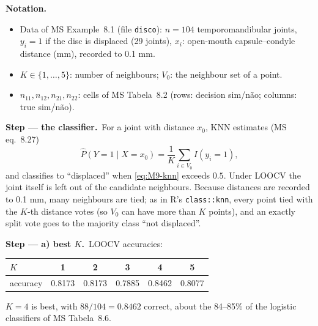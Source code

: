 \documentclass[11pt,a4paper]{article}
\numberwithin{equation}{questao}   %
\newenvironment{notacao}{\par\smallskip\noindent\textbf{Notation.}\begin{itemize}[leftmargin=1.4em,topsep=1pt,itemsep=0pt]\small}{\end{itemize}}
\newcommand{\passo}[2]{\par\smallskip\noindent\textbf{Step --- #1.}~#2}
\begin{document}
\begin{sol}
\begin{notacao}
\item Data of MS Example~8.1 (file \texttt{disco}): $n=104$ temporomandibular joints, $y_i=1$ if
  the disc is displaced (29 joints), $x_i$: open-mouth capsule--condyle distance (mm), recorded to 0.1 mm.
\item $K\in\{1,\dots,5\}$: number of neighbours; $V_0$: the neighbour set of a point.
\item $n_{11},n_{12},n_{21},n_{22}$: cells of MS Tabela~8.2 (rows: decision sim/não; columns: true sim/não).
\end{notacao}

\passo{the classifier}{For a joint with distance $x_0$, KNN estimates (MS eq.~8.27)
\begin{equation}\label{eq:M9-knn}
\hat P(Y=1\mid X=x_0)=\frac1K\sum_{i\in V_0}I(y_i=1),
\end{equation}
and classifies to ``displaced'' when \eqref{eq:M9-knn} exceeds $0.5$. Under LOOCV the joint itself is
left out of the candidate neighbours. Because distances are recorded to 0.1 mm, many neighbours
are tied; as in R's \texttt{class::knn}, every point tied with the $K$-th distance votes (so $V_0$
can have more than $K$ points), and an exactly split vote goes to the majority class ``not
displaced''.}

\passo{a) best $K$}{LOOCV accuracies:
\begin{center}\begin{tabular}{lccccc}\toprule
$K$ & 1 & 2 & 3 & 4 & 5\\\midrule
accuracy & 0.8173 & 0.8173 & 0.7885 & 0.8462 & 0.8077\\\bottomrule\end{tabular}\end{center}
$K=4$ is best, with $88/104=0.8462$ correct, about the 84--85\% of the logistic classifiers of
MS Tabela~8.6.}


\end{sol}
\end{document}

